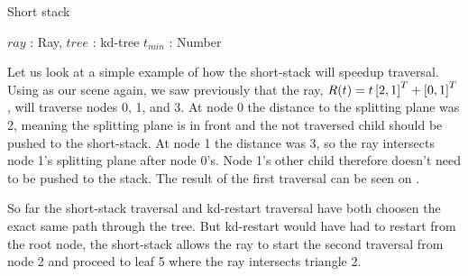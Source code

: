 \begin{algorithm}
  \caption{Short stack}
  \label{alg:ShortStack}
  \begin{algorithmic}
              {$ray$ : Ray, $tree$ : kd-tree}
              {$t_{min}$ : Number}{
      \ELSE
        \color{green}
      \ENDIF
            \color{green}
          \ENDIF
        \ELSE
        \ENDIF
      \ENDWHILE
      \ENDFOR
      \ENDIF
    \ENDWHILE
              }
  \end{algorithmic}
\end{algorithm}


Let us look at a simple example of how the short-stack will speedup
traversal. Using  as our scene again, we
saw previously that the ray, $R(t) = t \left[2, 1 \right]^T +
\left[0, 1 \right]^T$, will traverse nodes 0, 1, and 3. At node 0 the
distance to the splitting plane was 2, meaning the splitting plane is
in front and the not traversed child should be pushed to the
short-stack. At node 1 the distance was 3, so the ray intersects node
1's splitting plane after node 0's. Node 1's other child therefore
doesn't need to be pushed to the stack. The result of the first
traversal can be seen on .

So far the short-stack traversal and kd-restart traversal have both
choosen the exact same path through the tree. But kd-restart would
have had to restart from the root node, the short-stack allows the ray
to start the second traversal from node 2 and proceed to leaf 5 where
the ray intersects triangle 2. 

